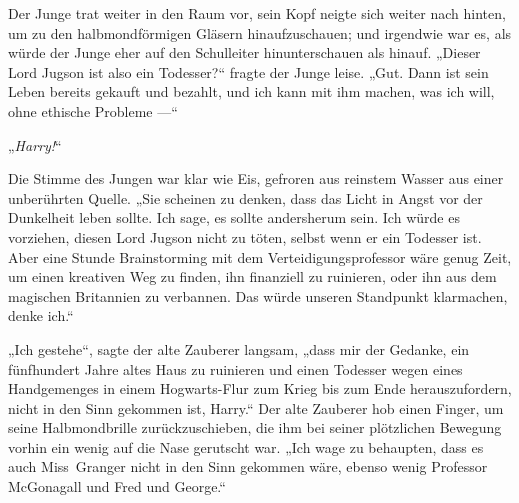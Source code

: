Der Junge trat weiter in den Raum vor, sein Kopf neigte sich weiter nach hinten, um zu den halbmondförmigen Gläsern hinaufzuschauen; und irgendwie war es, als würde der Junge eher auf den Schulleiter hinunterschauen als hinauf.
„Dieser Lord Jugson ist also ein Todesser?“ fragte der Junge leise.
„Gut. Dann ist sein Leben bereits gekauft und bezahlt, und ich kann mit ihm machen, was ich will, ohne ethische Probleme —“

„\emph{Harry!}“

Die Stimme des Jungen war klar wie Eis, gefroren aus reinstem Wasser aus einer unberührten Quelle.
„Sie scheinen zu denken, dass das Licht in Angst vor der Dunkelheit leben sollte. Ich sage, es sollte andersherum sein. Ich würde es vorziehen, diesen Lord Jugson nicht zu töten, selbst wenn er ein Todesser ist. Aber eine Stunde Brainstorming mit dem Verteidigungsprofessor wäre genug Zeit, um einen kreativen Weg zu finden, ihn finanziell zu ruinieren, oder ihn aus dem magischen Britannien zu verbannen. Das würde unseren Standpunkt klarmachen, denke ich.“

„Ich gestehe“, sagte der alte Zauberer langsam, „dass mir der Gedanke, ein fünfhundert Jahre altes Haus zu ruinieren und einen Todesser wegen eines Handgemenges in einem Hogwarts-Flur zum Krieg bis zum Ende herauszufordern, nicht in den Sinn gekommen ist, Harry.“ Der alte Zauberer hob einen Finger, um seine Halbmondbrille zurückzuschieben, die ihm bei seiner plötzlichen Bewegung vorhin ein wenig auf die Nase gerutscht war.
„Ich wage zu behaupten, dass es auch Miss~Granger nicht in den Sinn gekommen wäre, ebenso wenig Professor McGonagall und Fred und George.“

